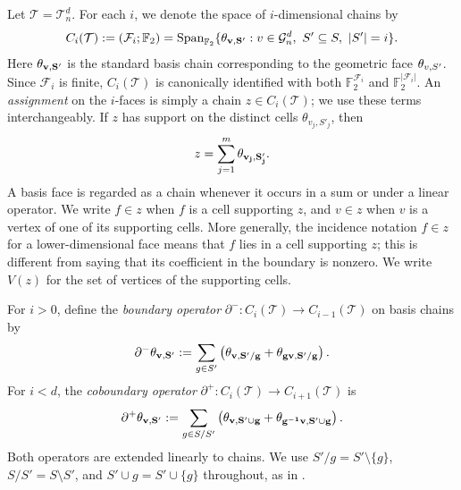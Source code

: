 \begin{definition}
\label{def:asontoric}
Let $\mathcal T=\mathcal T_n^d$. For each $i$, we denote the space of $i$-dimensional chains by
\begin{equation*}
  C_i(\mathcal T):=(\mathcal F_i;\mathbb F_2)
  =\operatorname{Span}_{\mathbb F_2}\{\mathbf{\theta_{v ,S'} }:
  v\in\mathcal G_n^d,\ S'\subseteq S,\ |S'|=i\}.
\end{equation*}
Here $\mathbf{\theta_{v ,S'} }$ is the standard basis chain corresponding to the geometric face $\theta_{v ,S'}$. Since $\mathcal F_i$ is finite, $C_i(\mathcal T)$ is canonically identified with both $\mathbb F_2^{\mathcal F_i}$ and $\mathbb F_2^{|\mathcal F_i|}$. An \emph{assignment} on the $i$-faces is simply a chain $z\in C_i(\mathcal T)$; we use these terms interchangeably. If $z$ has support on the distinct cells $\theta_{v_j,S'_j}$, then
\begin{equation*}
  z=\sum_{j=1}^{m}\mathbf{\theta_{v_j ,S'_j} }.
\end{equation*}
A basis face is regarded as a chain whenever it occurs in a sum or under a linear operator. We write $f\in z$ when $f$ is a cell supporting $z$, and $v\in z$ when $v$ is a vertex of one of its supporting cells. More generally, the incidence notation $f\in z$ for a lower-dimensional face means that $f$ lies in a cell supporting $z$; this is different from saying that its coefficient in the boundary is nonzero. We write $V(z)$ for the set of vertices of the supporting cells.

For $i>0$, define the \emph{boundary operator} $\partial^-:C_i(\mathcal T)\to C_{i-1}(\mathcal T)$ on basis chains by
\begin{equation*}
  \partial^-\mathbf{\theta_{v ,S'} }
  :=\sum_{g\in S'}\left(
       \mathbf{\theta_{v ,S'/g} }+\mathbf{\theta_{gv ,S'/g} }\right).
\end{equation*}
For $i<d$, the \emph{coboundary operator} $\partial^+:C_i(\mathcal T)\to C_{i+1}(\mathcal T)$ is
\begin{equation*}
  \partial^+\mathbf{\theta_{v ,S'} }
  :=\sum_{g\in S/S'}\left(
       \mathbf{\theta_{v ,S'\cup g} }+\mathbf{\theta_{g^{-1}v ,S'\cup g} }\right).
\end{equation*}
Both operators are extended linearly to chains. We use $S'/g=S'\setminus\{g\}$, $S/S'=S\setminus S'$, and $S'\cup g=S'\cup\{g\}$ throughout, as in .


\end{definition}
